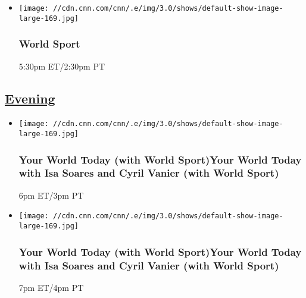 \begin{itemize}
\item
  \texttt{[image: //cdn.cnn.com/cnn/.e/img/3.0/shows/default-show-image-large-169.jpg]}

  \hypertarget{world-sport-14}{%
  \subsubsection{World Sport}\label{world-sport-14}}

  5:30pm ET/2:30pm PT
\end{itemize}

\hypertarget{evening--4}{%
\subsection{\texorpdfstring{\href{/tv/schedule/cnn/index.html}{Evening}~}{Evening~}}\label{evening--4}}

\begin{itemize}
\item
  \texttt{[image: //cdn.cnn.com/cnn/.e/img/3.0/shows/default-show-image-large-169.jpg]}

  \hypertarget{your-world-today-with-world-sportyour-world-today-with-isa-soares-and-cyril-vanier-with-world-sport--4}{%
  \subsubsection{Your World Today (with World Sport)Your World Today
  with Isa Soares and Cyril Vanier (with World Sport)
  }\label{your-world-today-with-world-sportyour-world-today-with-isa-soares-and-cyril-vanier-with-world-sport--4}}

  6pm ET/3pm PT
\end{itemize}

\begin{itemize}
\item
  \texttt{[image: //cdn.cnn.com/cnn/.e/img/3.0/shows/default-show-image-large-169.jpg]}

  \hypertarget{your-world-today-with-world-sportyour-world-today-with-isa-soares-and-cyril-vanier-with-world-sport--5}{%
  \subsubsection{Your World Today (with World Sport)Your World Today
  with Isa Soares and Cyril Vanier (with World Sport)
  }\label{your-world-today-with-world-sportyour-world-today-with-isa-soares-and-cyril-vanier-with-world-sport--5}}

  7pm ET/4pm PT
\end{itemize}

